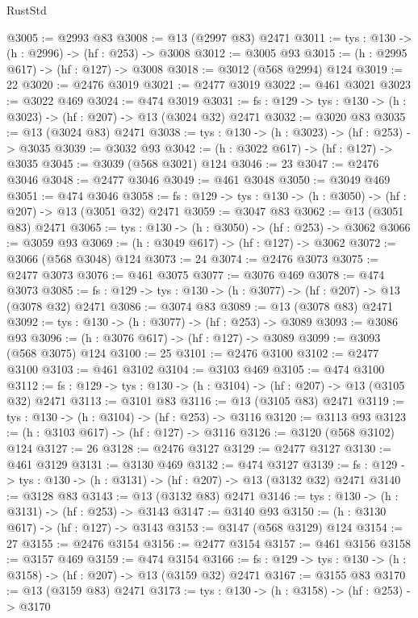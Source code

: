 \begin{lexlean}{RustStd}
\begin{coremodule}
@3005 := @2993 @83
@3008 := @13 (@2997 @83) @2471
@3011 := {tys : @130} -> (h : @2996) -> (hf : @253) -> @3008
@3012 := @3005 @93
@3015 := (h : @2995 @617) -> (hf : @127) -> @3008
@3018 := @3012 (@568 @2994) @124
@3019 := 22
@3020 := @2476 @3019
@3021 := @2477 @3019
@3022 := @461 @3021
@3023 := @3022 @469
@3024 := @474 @3019
@3031 := {fs : @129} -> {tys : @130} -> (h : @3023) -> (hf : @207) -> @13 (@3024 @32) @2471
@3032 := @3020 @83
@3035 := @13 (@3024 @83) @2471
@3038 := {tys : @130} -> (h : @3023) -> (hf : @253) -> @3035
@3039 := @3032 @93
@3042 := (h : @3022 @617) -> (hf : @127) -> @3035
@3045 := @3039 (@568 @3021) @124
@3046 := 23
@3047 := @2476 @3046
@3048 := @2477 @3046
@3049 := @461 @3048
@3050 := @3049 @469
@3051 := @474 @3046
@3058 := {fs : @129} -> {tys : @130} -> (h : @3050) -> (hf : @207) -> @13 (@3051 @32) @2471
@3059 := @3047 @83
@3062 := @13 (@3051 @83) @2471
@3065 := {tys : @130} -> (h : @3050) -> (hf : @253) -> @3062
@3066 := @3059 @93
@3069 := (h : @3049 @617) -> (hf : @127) -> @3062
@3072 := @3066 (@568 @3048) @124
@3073 := 24
@3074 := @2476 @3073
@3075 := @2477 @3073
@3076 := @461 @3075
@3077 := @3076 @469
@3078 := @474 @3073
@3085 := {fs : @129} -> {tys : @130} -> (h : @3077) -> (hf : @207) -> @13 (@3078 @32) @2471
@3086 := @3074 @83
@3089 := @13 (@3078 @83) @2471
@3092 := {tys : @130} -> (h : @3077) -> (hf : @253) -> @3089
@3093 := @3086 @93
@3096 := (h : @3076 @617) -> (hf : @127) -> @3089
@3099 := @3093 (@568 @3075) @124
@3100 := 25
@3101 := @2476 @3100
@3102 := @2477 @3100
@3103 := @461 @3102
@3104 := @3103 @469
@3105 := @474 @3100
@3112 := {fs : @129} -> {tys : @130} -> (h : @3104) -> (hf : @207) -> @13 (@3105 @32) @2471
@3113 := @3101 @83
@3116 := @13 (@3105 @83) @2471
@3119 := {tys : @130} -> (h : @3104) -> (hf : @253) -> @3116
@3120 := @3113 @93
@3123 := (h : @3103 @617) -> (hf : @127) -> @3116
@3126 := @3120 (@568 @3102) @124
@3127 := 26
@3128 := @2476 @3127
@3129 := @2477 @3127
@3130 := @461 @3129
@3131 := @3130 @469
@3132 := @474 @3127
@3139 := {fs : @129} -> {tys : @130} -> (h : @3131) -> (hf : @207) -> @13 (@3132 @32) @2471
@3140 := @3128 @83
@3143 := @13 (@3132 @83) @2471
@3146 := {tys : @130} -> (h : @3131) -> (hf : @253) -> @3143
@3147 := @3140 @93
@3150 := (h : @3130 @617) -> (hf : @127) -> @3143
@3153 := @3147 (@568 @3129) @124
@3154 := 27
@3155 := @2476 @3154
@3156 := @2477 @3154
@3157 := @461 @3156
@3158 := @3157 @469
@3159 := @474 @3154
@3166 := {fs : @129} -> {tys : @130} -> (h : @3158) -> (hf : @207) -> @13 (@3159 @32) @2471
@3167 := @3155 @83
@3170 := @13 (@3159 @83) @2471
@3173 := {tys : @130} -> (h : @3158) -> (hf : @253) -> @3170

\end{coremodule}
\end{lexlean}
